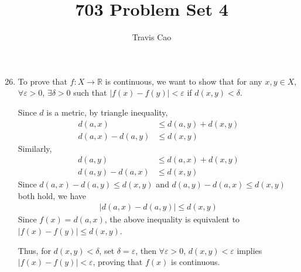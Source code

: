 \documentclass[11pt]{article}
\title{703 Problem Set 4}
\author{Travis Cao}
\numberwithin{equation}{section}
\theoremstyle{definition}
\newcommand{\1}{\mathbbm 1}
\newcommand{\e}{\varepsilon}
\newcommand{\RR}{\mathbb R}
\begin{document}
\maketitle

\begin{enumerate}
  \setcounter{enumi}{25}
  \item %
    To prove that $f: X \rightarrow \RR$ is continuous, we want to show that for any $x, y \in X$, $\forall \e > 0$, $\exists \delta > 0$ such that $|f(x) - f(y)| < \e$ if $d(x, y) < \delta$. 

    Since $d$ is a metric, by triangle inequality, 
    \begin{align*}
      d(a, x) &\leq d(a, y) + d(x, y) \\
      d(a, x) - d(a, y) &\leq d(x, y) 
    \end{align*}
    Similarly, 
    \begin{align*}
      d(a, y) &\leq d(a, x) + d(x, y) \\
      d(a, y) - d(a, x) &\leq d(x, y)
    \end{align*}
    Since $d(a, x) - d(a, y) \leq d(x, y)$ and $d(a, y) - d(a, x) \leq d(x, y)$ both hold, we have
    \begin{align*}
      |d(a, x) - d(a, y)| \leq d(x, y)
    \end{align*}
    Since $f(x) = d(a, x)$, the above inequality is equivalent to $|f(x) - f(y)| \leq d(x, y)$. 

    Thus, for $d(x, y) < \delta$, set $\delta = \e$, then $\forall \e > 0$, $d(x, y) < \e$ implies $|f(x) - f(y)| < \e$, proving that $f(x)$ is continuous. 
\end{enumerate}
\end{document}
